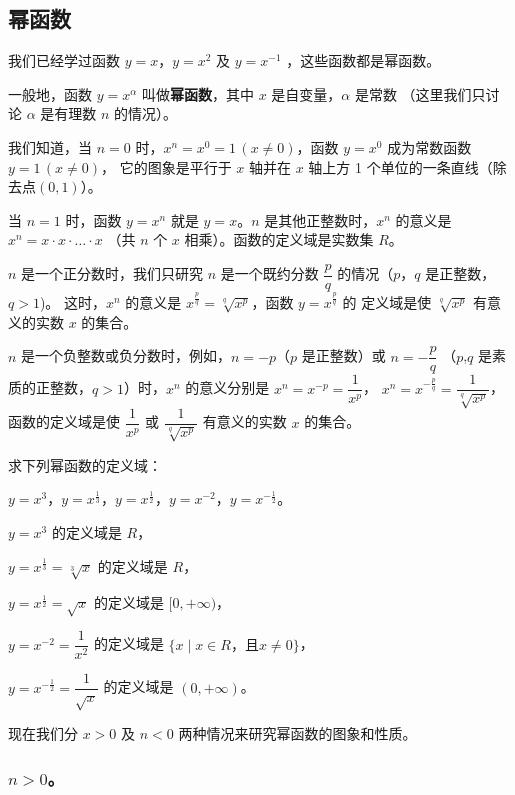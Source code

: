\subsection{幂函数}

我们已经学过函数 $y=x$，$y=x^2$ 及 $y=x^{-1}$ ，这些函数都是幂函数。

一般地，函数 $y=x^\alpha$ 叫做\textbf{幂函数}，其中 $x$ 是自变量，$\alpha$ 是常数
（这里我们只讨论 $\alpha$ 是有理数 $n$ 的情况）。

我们知道，当 $n=0$ 时，$x^n = x^0 = 1\, (x \neq 0)$，函数 $y = x^0$ 成为常数函数 $y=1\, (x \neq 0)$，
它的图象是平行于 $x$ 轴并在 $x$ 轴上方 1 个单位的一条直线（除去点$(0, 1)$）。

当 $n=1$ 时，函数 $y=x^n$ 就是 $y=x$。$n$ 是其他正整数时，$x^n$ 的意义是 $x^n = x \cdot x \cdot \dots \cdot x$ 
（共 $n$ 个 $x$ 相乘）。函数的定义域是实数集 $R$。

$n$ 是一个正分数时，我们只研究 $n$ 是一个既约分数 $\dfrac{p}{q}$ 的情况（$p$，$q$ 是正整数，$q>1$)。
这时，$x^n$ 的意义是 $x^\frac{p}{q} = \sqrt[q]{x^p}$，函数 $y = x^\frac{p}{q}$ 的
定义域是使 $\sqrt[q]{x^p}$ 有意义的实数 $x$ 的集合。

$n$ 是一个负整数或负分数时，例如，$n = -p$（$p$ 是正整数）或 $n = -\dfrac{p}{q}$
（$p$,$q$ 是素质的正整数，$q>1$）时，$x^n$ 的意义分别是 $x^n = x^{-p} = \dfrac{1}{x^p}$，
$x^n = x^{-\frac{p}{q}} = \dfrac{1}{\sqrt[q]{x^p}}$，函数的定义域是使 $\dfrac{1}{x^p}$
或 $\dfrac{1}{\sqrt[q]{x^p}}$ 有意义的实数 $x$ 的集合。

\liti 求下列幂函数的定义域：

\hspace{2em} $y = x^3$，$y = x^{\frac 1 3}$，$y = x^{\frac 1 2}$，$y = x^{-2}$，$y = x^{-\frac 1 2}$。

\jie $y = x^3$ 的定义域是 $R$，

$y = x^{\frac 1 3} = \sqrt[3]{x}$ 的定义域是 $R$，

$y = x^{\frac 1 2} = \sqrt{x}$ 的定义域是 $[0, +\infty)$，

\vspace{0.5em}
$y = x^{-2} = \dfrac{1}{x^2}$ 的定义域是 $\{x \mid x \in R \text{，且} x \neq 0\}$，

\vspace{0.5em}
$y = x^{-\frac 1 2} = \dfrac{1}{\sqrt{x}}$ 的定义域是 $(0, +\infty)$。

现在我们分 $x>0$ 及 $n<0$ 两种情况来研究幂函数的图象和性质。

\subsubsection{$n>0$。}

